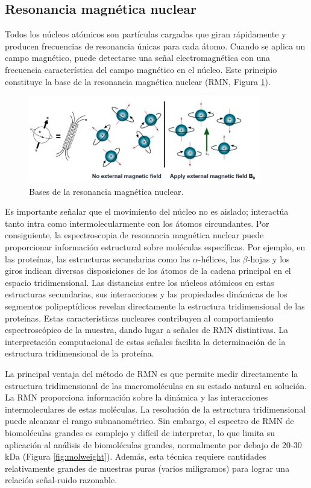 \subsection{Resonancia magnética nuclear}
Todos los núcleos atómicos son partículas cargadas que giran rápidamente y producen frecuencias de resonancia únicas para cada átomo. Cuando se aplica un campo magnético, puede detectarse una señal electromagnética con una frecuencia característica del campo magnético en el núcleo. Este principio constituye la base de la resonancia magnética nuclear (RMN, Figura \ref{fig/rmn}).

\begin{figure}[h]
\centering
\includegraphics[width = 0.9\textwidth]{figs/paste-2013F0AC.png}
\caption{Bases de la resonancia magnética nuclear.}
\label{fig/rmn}
\end{figure}

Es importante señalar que el movimiento del núcleo no es aislado; interactúa tanto intra como intermolecularmente con los átomos circundantes. Por consiguiente, la espectroscopia de resonancia magnética nuclear puede proporcionar información estructural sobre moléculas específicas. Por ejemplo, en las proteínas, las estructuras secundarias como las $\alpha$-hélices, las $\beta$-hojas y los giros indican diversas disposiciones de los átomos de la cadena principal en el espacio tridimensional. Las distancias entre los núcleos atómicos en estas estructuras secundarias, sus interacciones y las propiedades dinámicas de los segmentos polipeptídicos revelan directamente la estructura tridimensional de las proteínas. Estas características nucleares contribuyen al comportamiento espectroscópico de la muestra, dando lugar a señales de RMN distintivas. La interpretación computacional de estas señales facilita la determinación de la estructura tridimensional de la proteína.

La principal ventaja del método de RMN es que permite medir directamente la estructura tridimensional de las macromoléculas en su estado natural en solución. La RMN proporciona información sobre la dinámica y las interacciones intermoleculares de estas moléculas. La resolución de la estructura tridimensional puede alcanzar el rango subnanométrico. Sin embargo, el espectro de RMN de biomoléculas grandes es complejo y difícil de interpretar, lo que limita su aplicación al análisis de biomoléculas grandes, normalmente por debajo de 20-30 kDa (Figura \ref{fig:molweight}). Además, esta técnica requiere cantidades relativamente grandes de muestras puras (varios miligramos) para lograr una relación señal-ruido razonable.


